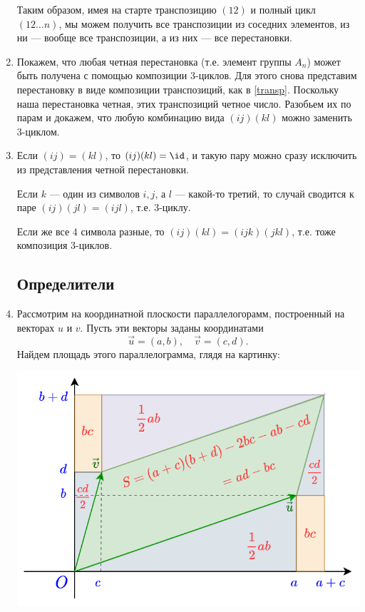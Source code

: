 \begin{enumerate}
Таким образом, имея на старте транспозицию $(12)$ и полный цикл $(12\dots n)$, мы можем получить все транспозиции из соседних элементов, из ни --- вообще все транспозиции, а из них --- все перестановки.

\item Покажем, что любая четная перестановка (т.е. элемент группы $A_n$) может быть получена с помощью композиции 3-циклов.
Для этого снова представим перестановку в виде композиции транспозиций, как в \eqref{transp}. Поскольку наша перестановка четная, этих транспозиций четное число. Разобьем их по парам и докажем, что любую комбинацию вида $(ij)(kl)$ можно заменить 3-циклом.

\item Если $(ij)=(kl)$, то $(ij)(kl)=\id$, и такую пару можно сразу исключить из представления четной перестановки.

Если $k$ --- один из символов $i,j$, а $l$ --- какой-то третий, то случай сводится к паре $(ij)(jl)=(ijl)$, т.е. 3-циклу.

Если же все 4 символа разные, то $(ij)(kl)=(ijk)(jkl)$, т.е. тоже композиция 3-циклов.


\subsection*{Определители}

\item Рассмотрим на координатной плоскости параллелогорамм, построенный на векторах $u$ и $v$. Пусть эти векторы заданы координатами
$$
\vec u=(a,b),\quad \vec v=(c,d).
$$
Найдем площадь этого параллелограмма, глядя на картинку:

\begin{center}
\includegraphics[scale=0.4]{paralel.png}
\end{center}


\end{enumerate}
